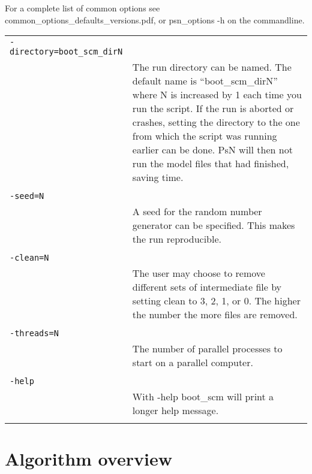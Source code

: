 \documentclass[a4paper,12pt]{article}
\begin{document}
For a complete list of common options see common\_options\_defaults\_versions.pdf, or psn\_options -h on the commandline.

\begin{longtable}{p{1in}p{4in}}
\verb|-directory=boot_scm_dirN| & \\
\nopagebreak
 & The run directory can be named. The default name is “boot\_scm\_dirN” where N is increased by 1 each time you run the script. If the run is aborted or crashes, setting the directory to the one from which the script was running earlier can be done. PsN will then not run the model files that had finished, saving time. \\
\\
\verb|-seed=N| & \\
\nopagebreak
 & A seed for the random number generator can be specified. This makes the run reproducible.  \\
\\
\verb|-clean=N| & \\
\nopagebreak
 & The user may choose to remove different sets of intermediate file by setting clean to 3, 2, 1, or 0. The higher the number the more files are removed. \\
\\
\verb|-threads=N| & \\
\nopagebreak
 & The number of parallel processes to start on a parallel computer. \\
\\
\verb|-help| & \\
\nopagebreak
 & With -help boot\_scm will print a longer help message. \\
\\
\end{longtable}


\section{Algorithm overview}
\end{document}
